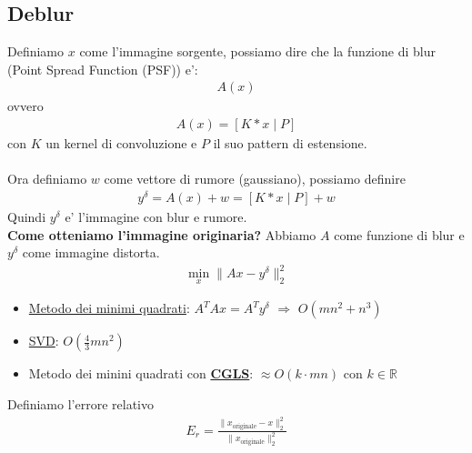 \documentclass[a4paper,12pt]{article}
\begin{document}
\subsection{Deblur}
Definiamo $x$ come l'immagine sorgente, possiamo dire che la funzione di blur (Point Spread Function (PSF)) e':
\begin{align*}
    A(x)
\end{align*}
ovvero
\begin{align*}
    A(x) = [K * x \mid P]
\end{align*}
con $K$ un kernel di convoluzione e $P$ il suo pattern di estensione. \\
\vspace{1px}\\
Ora definiamo $w$ come vettore di rumore (gaussiano), possiamo definire
\begin{align*}
    y^\delta = A(x) + w = [K * x \mid P] + w
\end{align*}
Quindi $y^\delta$ e' l'immagine con blur e rumore. \\
\textbf{Come otteniamo l'immagine originaria?}
Abbiamo $A$ come funzione di blur e $y^\delta$ come immagine distorta.
\begin{align*}
    \min_x \|Ax - y^\delta \|_2^2
\end{align*}
\begin{itemize}
    \item \hyperref[sec:min_quad]{Metodo dei minimi quadrati}: $A^T Ax=A^T y^\delta$ $\Rightarrow$ $O(mn^2 + n^3)$
    \item \hyperref[sec:svd]{SVD}: $O(\frac{4}{3}mn^2)$
    \item Metodo dei minini quadrati con \hyperref[sec:cgls]{\textbf{CGLS}}: $\approx O(k \cdot mn)$ con $k \in \mathbb{R}$
\end{itemize}
Definiamo l'errore relativo
\begin{align*}
    E_r = \frac{\| x_\text{originale} - x \|_2^2}{\| x_\text{originale} \|_2^2}
\end{align*}
\end{document}
